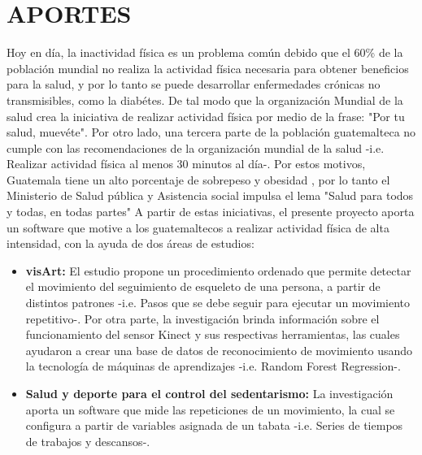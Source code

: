 \section{APORTES}
Hoy en d\'ia, la inactividad f\'isica es un problema com\'un debido que el 60\% de la poblaci\'on mundial no realiza la actividad f\'isica necesaria para obtener beneficios para la salud, y por lo tanto se puede desarrollar enfermedades cr\'onicas no transmisibles, como la diab\'etes. De tal modo que la organizaci\'on Mundial de la salud crea la iniciativa de realizar actividad f\'isica por medio de la frase: "Por tu salud, muev\'ete". \cite{orgSaludAF}
\medbreak
Por otro lado, una tercera parte de la poblaci\'on guatemalteca no cumple con las recomendaciones de la organizaci\'on mundial de la salud -i.e. Realizar actividad f\'isica al menos 30 minutos al d\'ia-. Por estos motivos, Guatemala tiene un alto porcentaje de sobrepeso y obesidad , por lo tanto el Ministerio de Salud p\'ublica y Asistencia social impulsa el lema "Salud para todos y todas, en todas partes" \cite{minSaludPub}
\medbreak
A partir de estas iniciativas, el presente proyecto aporta un software que motive a los guatemaltecos a realizar actividad f\'isica de alta intensidad, con la ayuda de dos \'areas de estudios:
\begin{itemize}
	\item \textbf{\gls{visArt}:} El estudio propone un procedimiento ordenado que permite detectar el movimiento del seguimiento de esqueleto de una persona, a partir de distintos patrones -i.e. Pasos que se debe seguir para ejecutar un movimiento repetitivo-. Por otra parte, la investigaci\'on brinda informaci\'on sobre el funcionamiento del sensor Kinect y sus respectivas herramientas, las cuales ayudaron a crear una base de datos de reconocimiento de  movimiento usando la tecnolog\'ia de m\'aquinas de aprendizajes -i.e. Random Forest Regression-.
	\item \textbf{Salud y deporte para el control del sedentarismo:} La investigaci\'on aporta un software que mide las repeticiones de un movimiento, la cual se configura a partir de variables asignada de un tabata -i.e. Series de tiempos de trabajos y descansos-.
\end{itemize}